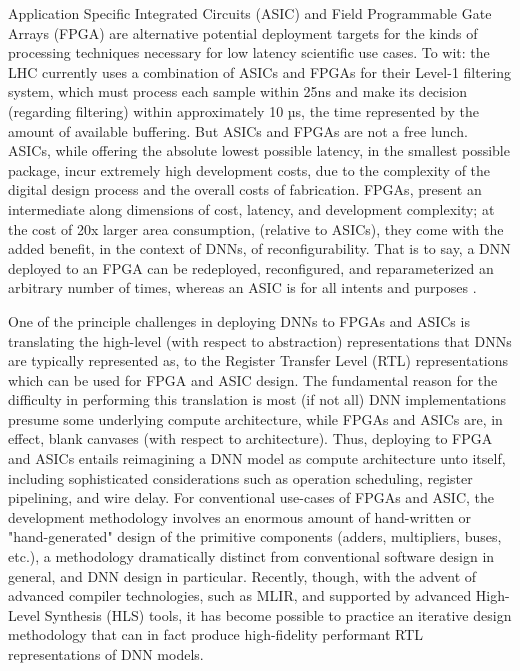 Application Specific Integrated Circuits (ASIC) and Field Programmable Gate Arrays (FPGA) are alternative potential deployment targets for the kinds of processing techniques necessary for low latency scientific use cases.
To wit: the LHC currently uses a combination of ASICs and FPGAs for their Level-1 filtering system, which must process each sample within 25ns and make its decision (regarding filtering) within approximately 10 µs, the time represented by the amount of available buffering.
But ASICs and FPGAs are not a free lunch.
ASICs, while offering the absolute lowest possible latency, in the smallest possible package, incur extremely high development costs, due to the complexity of the digital design process and the overall costs of fabrication.
FPGAs, present an intermediate along dimensions of cost, latency, and development complexity; at the cost of 20x larger area consumption,  (relative to ASICs), they come with the added benefit, in the context of DNNs, of reconfigurability.
That is to say, a DNN deployed to an FPGA can be redeployed, reconfigured, and reparameterized an arbitrary number of times, whereas an ASIC is for all intents and purposes .

One of the principle challenges in deploying DNNs to FPGAs and ASICs is translating the high-level (with respect to abstraction) representations that DNNs are typically represented as, to the Register Transfer Level (RTL) representations which can be used for FPGA and ASIC design.
The fundamental reason for the difficulty in performing this translation is most (if not all) DNN implementations presume some underlying compute architecture, while FPGAs and ASICs are, in effect, blank canvases (with respect to architecture).
Thus, deploying to FPGA and ASICs entails reimagining a DNN model as compute architecture unto itself, including sophisticated considerations such as operation scheduling, register pipelining, and wire delay.
For conventional use-cases of FPGAs and ASIC, the development methodology involves an enormous amount of hand-written or "hand-generated"\cite{nikhil2004bluespec} design of the primitive components (adders, multipliers, buses, etc.), a methodology dramatically distinct from conventional software design in general, and DNN design in particular.
Recently, though, with the advent of advanced compiler technologies, such as MLIR, and supported by advanced High-Level Synthesis (HLS) tools, it has become possible to practice an iterative design methodology that can in fact produce high-fidelity performant RTL representations of DNN models.

